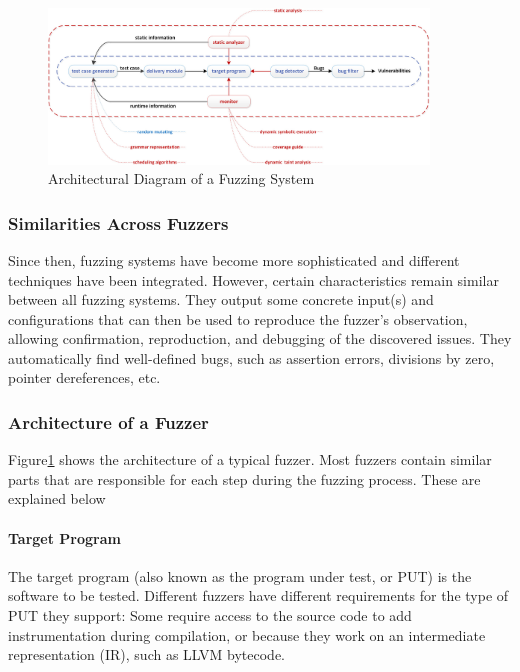 \documentclass{article}
\begin{document}
\begin{multicols}{2}
    \begin{figure}[!tp]
        \centering
        \includegraphics[width=0.9\textwidth]{assets/FuzzingSteps.jpg}
        \caption{Architectural Diagram of a Fuzzing System\cite{Science}}
        \label{fig:FuzzingSteps}
    \end{figure}
    \subsubsection{Similarities Across Fuzzers}
    Since then, fuzzing systems have become more sophisticated and different techniques have been integrated. However, certain characteristics remain similar between all fuzzing systems. They output some concrete input(s) and configurations that can then be used to reproduce the fuzzer's observation, allowing confirmation, reproduction, and debugging of the discovered issues.\cite{EvaluatingFuzzTesting} They automatically find well-defined bugs, such as assertion errors, divisions by zero,  pointer dereferences, etc.\cite{AllYouEverWanted}

    \subsubsection{Architecture of a Fuzzer}
    \label{ArchitectureFuzzer}
    Figure\ref{fig:FuzzingSteps} shows the architecture of a typical fuzzer. Most fuzzers contain similar parts that are responsible for each step during the fuzzing process. These are explained below

    \paragraph{Target Program}
    The target program (also known as the program under test, or PUT) is the software to be tested. Different fuzzers have different requirements for the type of PUT they support: Some require access to the source code to add instrumentation during compilation, or because they work on an intermediate representation (IR), such as LLVM bytecode.


\end{multicols}
\end{document}
